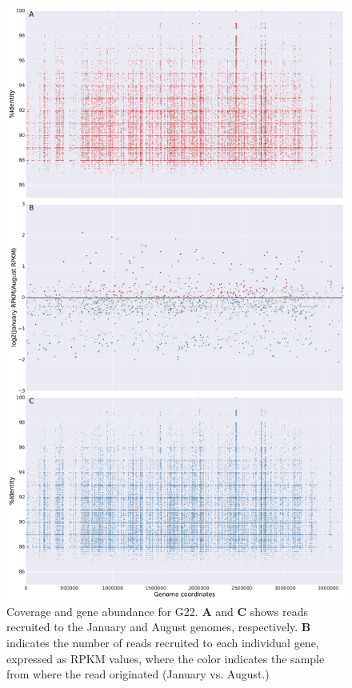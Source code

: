 \begin{figure}[!hbtp]
  \centering
  \includegraphics[width=\textwidth,height=0.8\textheight,keepaspectratio]{Chapter5/Figures/coverage_plots/G22_coverage.pdf}
  \caption{Coverage and gene abundance for G22. \textbf{A} and \textbf{C} shows reads recruited to the January and August genomes, respectively. \textbf{B} indicates the number of reads recruited to each individual gene, expressed as RPKM values, where the color indicates the sample from where the read originated (January vs. August.)}
  \label{G22coverage}
\end{figure}

